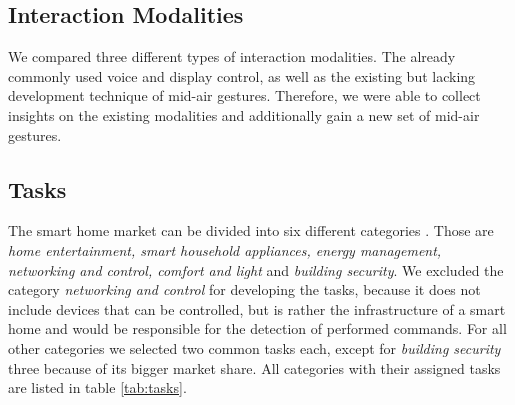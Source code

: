 \documentclass[sigchi]{acmart}
\begin{document}
	\subsection{Interaction Modalities}
	We compared three different types of interaction modalities. The already commonly used voice and display control, as well as the existing but lacking development technique of mid-air gestures. Therefore, we were able to collect insights on the existing modalities and additionally gain a new set of mid-air gestures.
	
	\subsection{Tasks}
	The smart home market can be divided into six different categories \cite{.c}. Those are \textit{home entertainment, smart household appliances, energy management, networking and control, comfort and light} and \textit{building security}. We excluded the category \textit{networking and control} for developing the tasks, because it does not include devices that can be controlled, but is rather the infrastructure of a smart home and would be responsible for the detection of performed commands. For all other categories we selected two common tasks \cite{.d} each, except for \textit{building security} three because of its bigger market share. All categories with their assigned tasks are listed in table \ref{tab:tasks}.
\end{document}

